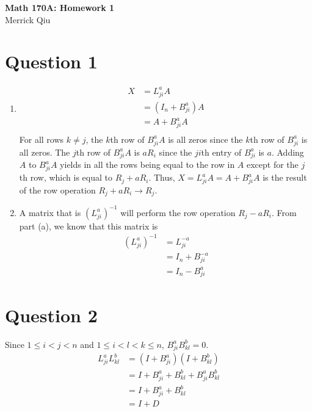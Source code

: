 \documentclass{article}
\begin{document}
\begin{center}
	\huge{\bf Math 170A: Homework 1} \\
	Merrick Qiu
\end{center}

\section*{Question 1}
\begin{enumerate}
    \item \begin{align*}
        X &= L_{ji}^aA \\
        &= (I_n + B_{ji}^a)A \\
        &= A + B_{ji}^aA \\
    \end{align*}
    For all rows $k \neq j$, the $k$th row of $B_{ji}^aA$ is all zeros
    since the $k$th row of $B_{ji}^a$ is all zeros.
    The $j$th row of $B_{ji}^aA$ is $aR_i$ since the $ji$th entry 
    of $B_{ji}^a$ is $a$.
    Adding $A$ to $B_{ji}^aA$ yields in all the rows being equal to 
    the row in $A$ except for the $j$th row, which is equal to $R_j + aR_i$.
    Thus, $X = L_{ji}^aA = A + B_{ji}^aA$ 
    is the result of the row operation $R_j + aR_i \rightarrow R_j$.
    \item A matrix that is $(L_{ji}^a)^{-1}$ will perform the row operation $R_j - aR_i$.
    From part (a), we know that this matrix is 
    \begin{align*}
        (L_{ji}^a)^{-1} &= L_{ji}^{-a} \\
        &= I_n + B_{ji}^{-a} \\
        &= I_n - B_{ji}^{a}
    \end{align*}
\end{enumerate}
\newpage 

\section*{Question 2}
Since $1 \leq i < j < n$ and $1 \leq i < l < k \leq n$,
$B_{ji}^aB_{kl}^b = 0$.
\begin{align*}
    L_{ji}^aL_{kl}^b &= (I + B_{ji}^a)(I + B_{kl}^b) \\
    &= I + B_{ji}^a + B_{kl}^b + B_{ji}^aB_{kl}^b \\
    &= I + B_{ji}^a + B_{kl}^b \\
    &= I + D
\end{align*}
\newpage
\end{document}
